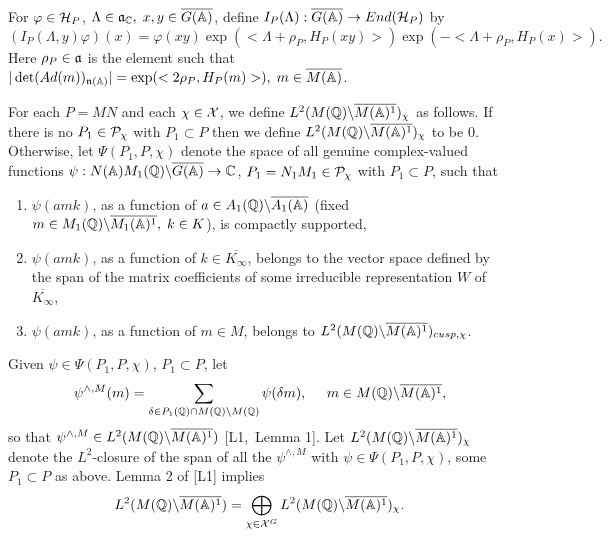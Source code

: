 For $\varphi \in {\cal H}_P$,
$\Lambda \in {\frak{a}}_{{\Bbb C}},\;x,y\in \overline{G({\Bbb{A}})}$,
define $I_P(\Lambda ):\overline{G({\Bbb{A}})}\rightarrow End({\cal H}_P)$ by 
\[
(I_P(\Lambda ,y)\varphi )(x)=\varphi (xy)\exp (<\Lambda +\rho
_P,H_P(xy)>)\exp (-<\Lambda +\rho _P,H_P(x)>). 
\]
Here $\rho _P\in {\frak{a}}$ is the element such that
$|\det (Ad(m))_{{\frak{n}}({\Bbb A})}|
=\exp (<2\rho _P,H_P(m)>),\;m\in \overline{M({\Bbb{A}})}$.

For each $P=MN$ and each $\chi \in {\cal X}$, we define
$L^2(M({\Bbb{Q}})\backslash \overline{M({\Bbb{A}})^1})_\chi $
as follows. If there is no $P_1\in {\cal P}_\chi $
with $P_1\subset P$ then we define
$L^2(M({{\Bbb{Q}}})\backslash \overline{M({\Bbb{A}})^1})_\chi $
to be $0$. Otherwise, let $\Psi (P_1,P,\chi )$ denote the space of
all genuine complex-valued functions
$\psi :N({\Bbb{A}})M_1({\Bbb{Q}})\backslash \overline{G({\Bbb{A}})}
\rightarrow {\Bbb C}$, $P_1=N_1M_1\in {\cal{P}}_\chi $ 
with $P_1\subset P$, such that

\begin{enumerate}
\item  $\psi (amk)$, as a function of 
$a\in A_1({\Bbb{Q}})\backslash \overline{A_1({\Bbb{A}})}$ (fixed 
$m\in M_1({\Bbb{Q}})\backslash \overline{M_1({\Bbb{A}})^1},\;k\in K$),
is compactly supported,

\item  $\psi (amk)$, as a function of $k\in \overline{K_\infty}$,
belongs to the
vector space defined by the span of the matrix coefficients of some
irreducible representation $W$ of $\overline{K_\infty}$,

\item  $\psi (amk)$, as a function of $m\in M$, belongs to 
$L^2(M({{\Bbb{Q}}})\backslash \overline{M({\Bbb{A}})^1})_{cusp,\chi }$.
\end{enumerate}

Given $\psi \in \Psi (P_1,P,\chi )$, $P_1\subset P$, let 
\[
\psi ^{\wedge ,M}(m)=
\sum_{\delta \in P_1({\Bbb{Q}})\cap
M({\Bbb{Q}})\backslash M({\Bbb{Q}})}
\psi (\delta m),\;\;\;\;\;
m\in M({\Bbb{Q}})\backslash \overline{M({\Bbb{A}})^1}, 
\]
so that
$\psi ^{\wedge ,M}\in
L^2(M({\Bbb{Q}})\backslash \overline{M({\Bbb{A}})^1})$
[L1,\ Lemma 1]. Let
$L^2(M({\Bbb{Q}})\backslash \overline{M({\Bbb{A}})^1})_\chi $ denote
the $L^2$-closure of the span of all the
$\psi ^{\wedge ,M}$ with $\psi \in \Psi (P_1,P,\chi )$,
some $P_1\subset P$ as above. Lemma 2 of [L1] implies 
\begin{equation}
L^2(M({\Bbb{Q}})\backslash \overline{M({\Bbb{A}})^1})
=\bigoplus_{\chi \in {\cal X}^G}
L^2(M({\Bbb{Q}})\backslash \overline{M({\Bbb{A}})^1})_\chi .
\end{equation}


